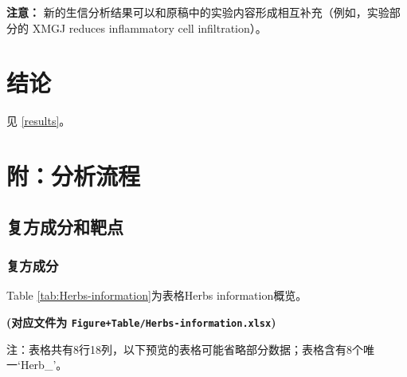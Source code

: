 \documentclass[
]{article}
\begin{document}
\textbf{注意：}
新的生信分析结果可以和原稿中的实验内容形成相互补充（例如，实验部分的 XMGJ reduces inflammatory cell infiltration）。

\hypertarget{dis}{%
\section{结论}\label{dis}}

见 \ref{results}。

\hypertarget{workflow}{%
\section{附：分析流程}\label{workflow}}

\hypertarget{ux590dux65b9ux6210ux5206ux548cux9776ux70b9}{%
\subsection{复方成分和靶点}\label{ux590dux65b9ux6210ux5206ux548cux9776ux70b9}}

\hypertarget{ux590dux65b9ux6210ux5206}{%
\subsubsection{复方成分}\label{ux590dux65b9ux6210ux5206}}

Table \ref{tab:Herbs-information}为表格Herbs information概览。

\textbf{(对应文件为 \texttt{Figure+Table/Herbs-information.xlsx})}

\begin{center}\begin{tcolorbox}[colback=gray!10, colframe=gray!50, width=0.9\linewidth, arc=1mm, boxrule=0.5pt]注：表格共有8行18列，以下预览的表格可能省略部分数据；表格含有8个唯一`Herb\_'。
\end{tcolorbox}
\end{center}
\end{document}

